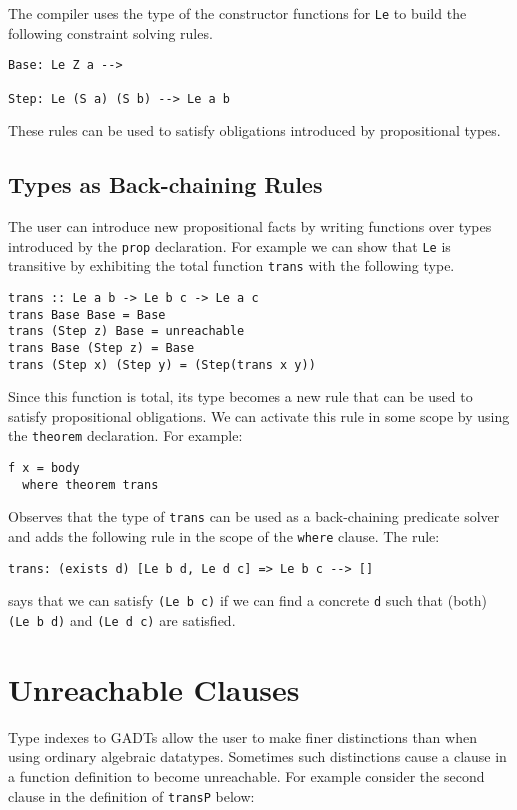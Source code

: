 \documentclass[11pt,twoside]{article}
\begin{document}
The compiler uses the type of the constructor functions
for {\tt Le} to build the following constraint solving rules.

\begin{verbatim}
Base: Le Z a -->

Step: Le (S a) (S b) --> Le a b
\end{verbatim}
These rules can be used to satisfy obligations introduced
by propositional types.


\subsection{Types as Back-chaining Rules}\label{back}

The user can introduce
new propositional facts by writing functions over types
introduced by the {\tt prop} declaration. For example
we can show that {\tt Le} is transitive by exhibiting
the total function {\tt trans} with the following type.

\begin{verbatim}
trans :: Le a b -> Le b c -> Le a c
trans Base Base = Base
trans (Step z) Base = unreachable
trans Base (Step z) = Base
trans (Step x) (Step y) = (Step(trans x y))
\end{verbatim}

Since this function is total, its type becomes a new rule
that can be used to satisfy propositional obligations. We
can activate this rule in some scope by using the {\tt theorem} declaration.
For example:
\begin{verbatim}
f x = body
  where theorem trans
\end{verbatim}
Observes that the type of {\tt trans} can be used
as a back-chaining predicate solver and adds the following rule
in the scope of the {\tt where} clause. The rule:

\begin{verbatim}
trans: (exists d) [Le b d, Le d c] => Le b c --> []
\end{verbatim}
says that we can satisfy {\tt (Le b c)} if we can find
a concrete {\tt d} such that (both) {\tt (Le b d)} and {\tt (Le d c)}
are satisfied.


\section{Unreachable Clauses}

Type indexes to GADTs allow the user to make finer distinctions
than when using ordinary algebraic datatypes. Sometimes such
distinctions cause a clause in a function definition to become
unreachable. For example consider the second clause in the definition of
{\tt transP} below:
\end{document}
